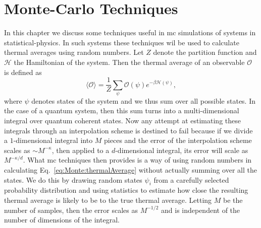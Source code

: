 \chapter{Monte-Carlo Techniques}

In this chapter we discuss some techniques useful in \ac{mc} simulations
of systems in statistical-physics.
In such systems these techniques wil be used to calculate thermal averages using random numbers. Let
$Z$ denote the partition function and $\mathcal{H}$ the Hamiltonian of the system. Then the thermal
average of an observable $\mathcal{O}$ is defined as
\begin{equation}
    \label{eq:Monte:thermalAverage}
    \langle\mathcal{O}\rangle = \frac{1}{Z}\sum_\psi\mathcal{O}(\psi)e^{-\beta\mathcal{H}(\psi)},
\end{equation}
where $\psi$ denotes states of the system and we thus sum over all possible states. In the case of
a quantum system, then this sum turns into a multi-dimensional integral over quantum coherent states.
Now any attempt at estimating these integrals through an interpolation scheme is destined to fail because if we divide
a $1$-dimensional integral into $M$ pieces and the error of the interpolation scheme scales as $\sim M^{-\kappa}$,
then applied to a $d$-dimensional integral, its error will scale as $M^{-\kappa/d}$.
What \ac{mc} techniques then provides is a way of using random numbers in calculating
Eq.~\eqref{eq:Monte:thermalAverage} without actually summing over all the states. We do this by drawing random states
$\psi_i$ from a carefully selected probability distribution and using statistics to estimate how close the resulting
thermal average is likely to be to the true thermal average. Letting $M$ be the number of samples, then the
error scales as $M^{-1/2}$ and is independent of the number of dimensions of the integral.

